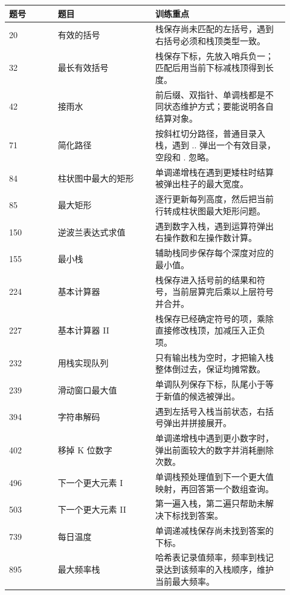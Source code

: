 
\begin{longtable}{@{}p{0.16\linewidth}p{0.32\linewidth}p{0.44\linewidth}@{}}
\toprule
题号 & 题目 & 训练重点\\
\midrule
\endhead
20 & 有效的括号 & 栈保存尚未匹配的左括号，遇到右括号必须和栈顶类型一致。\\
32 & 最长有效括号 & 栈保存下标，先放入哨兵负一；匹配后用当前下标减栈顶得到长度。\\
42 & 接雨水 & 前后缀、双指针、单调栈都是不同状态维护方式；要能说明各自结算对象。\\
71 & 简化路径 & 按斜杠切分路径，普通目录入栈，遇到 .. 弹出一个有效目录，空段和 . 忽略。\\
84 & 柱状图中最大的矩形 & 单调递增栈在遇到更矮柱时结算被弹出柱子的最大宽度。\\
85 & 最大矩形 & 逐行更新每列高度，然后把当前行转成柱状图最大矩形问题。\\
150 & 逆波兰表达式求值 & 遇到数字入栈，遇到运算符弹出右操作数和左操作数计算。\\
155 & 最小栈 & 辅助栈同步保存每个深度对应的最小值。\\
224 & 基本计算器 & 栈保存进入括号前的结果和符号，当前层算完后乘以上层符号并合并。\\
227 & 基本计算器 II & 栈保存已经确定符号的项，乘除直接修改栈顶，加减压入正负项。\\
232 & 用栈实现队列 & 只有输出栈为空时，才把输入栈整体倒过去，保证均摊常数。\\
239 & 滑动窗口最大值 & 单调队列保存下标，队尾小于等于新值的候选被弹出。\\
394 & 字符串解码 & 遇到左括号入栈当前状态，右括号弹出并拼接展开。\\
402 & 移掉 K 位数字 & 单调递增栈中遇到更小数字时，弹出前面较大的数字并消耗删除次数。\\
496 & 下一个更大元素 I & 单调栈预处理值到下一个更大值映射，再回答第一个数组查询。\\
503 & 下一个更大元素 II & 第一遍入栈，第二遍只帮助未解决下标找到答案。\\
739 & 每日温度 & 单调递减栈保存尚未找到答案的下标。\\
895 & 最大频率栈 & 哈希表记录值频率，频率到栈记录达到该频率的入栈顺序，维护当前最大频率。\\
\bottomrule
\end{longtable}


